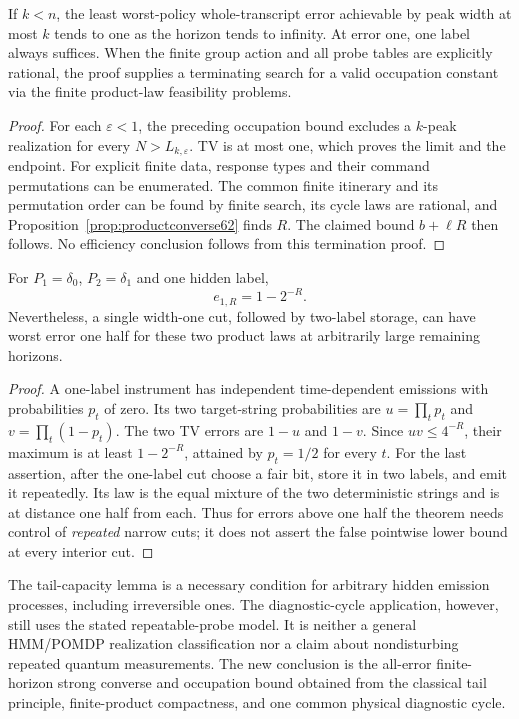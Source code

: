 \begin{corollary}
\label{cor:processerrorone62}
If $k<n$, the least worst-policy whole-transcript error achievable by
peak width at most $k$ tends to one as the horizon tends to infinity.
At error one, one label always suffices. When the finite group action
and all probe tables are explicitly rational, the proof supplies a
terminating search for a valid occupation constant via the finite
product-law feasibility problems.
\end{corollary}
\begin{proof}
For each $\varepsilon<1$, the preceding occupation bound excludes a
$k$-peak realization for every $N>L_{k,\varepsilon}$. TV is at most one,
which proves the limit and the endpoint. For explicit finite data,
response types and their command permutations can be enumerated. The
common finite itinerary and its permutation order can be found by finite
search, its cycle laws are rational, and
Proposition~\ref{prop:productconverse62} finds $R$. The claimed bound
$b+\ell R$ then follows. No efficiency conclusion follows from this
termination proof.
\end{proof}

\begin{proposition}
\label{prop:binarytail62}
For $P_1=\delta_0$, $P_2=\delta_1$ and one hidden label,
\begin{equation}\label{eq:binarytail62}
                         e_{1,R}=1-2^{-R}.
\end{equation}
Nevertheless, a single width-one cut, followed by two-label storage,
can have worst error one half for these two product laws at arbitrarily
large remaining horizons.
\end{proposition}
\begin{proof}
A one-label instrument has independent time-dependent emissions with
probabilities $p_t$ of zero. Its two target-string probabilities are
$u=\prod_t p_t$ and $v=\prod_t(1-p_t)$. The two TV errors are $1-u$
and $1-v$. Since $uv\le4^{-R}$, their maximum is at least $1-2^{-R}$,
attained by $p_t=1/2$ for every $t$. For the last assertion, after the
one-label cut choose a fair bit, store it in two labels, and emit it
repeatedly. Its law is the equal mixture of the two deterministic
strings and is at distance one half from each. Thus for errors above
one half the theorem needs control of \emph{repeated} narrow cuts;
it does not assert the false pointwise lower bound at every interior cut.
\end{proof}

The tail-capacity lemma is a necessary condition for arbitrary hidden
emission processes, including irreversible ones. The diagnostic-cycle
application, however, still uses the stated repeatable-probe model.
It is neither a general HMM/POMDP realization classification nor a
claim about nondisturbing repeated quantum measurements. The new
conclusion is the all-error finite-horizon strong converse and occupation
bound obtained from the classical tail principle, finite-product
compactness, and one common physical diagnostic cycle.
